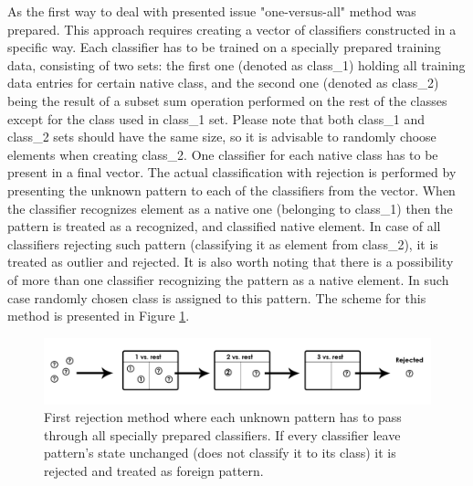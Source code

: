 \documentclass{llncs}
\begin{document}
As the first way to deal with presented issue "one-versus-all" method was prepared. This approach requires creating a vector of classifiers constructed in a specific way. Each classifier has to be trained on a specially prepared training data, consisting of two sets: the first one (denoted as class\_1) holding all training data entries for certain native class, and the second one (denoted as class\_2) being the result of a subset sum operation performed on the rest of the classes except for the class used in class\_1 set. Please note that both class\_1 and class\_2 sets should have the same size, so it is advisable to randomly choose elements when creating class\_2. One classifier for each native class has to be present in a final vector. The actual classification with rejection is performed by presenting the unknown pattern to each of the classifiers from the vector. When the classifier recognizes element as a native one (belonging to class\_1) then the pattern is treated as a recognized, and classified native element. In case of all classifiers rejecting such pattern (classifying it as element from class\_2), it is treated as outlier and rejected. It is also worth noting that there is a possibility of more than one classifier recognizing the pattern as a native element. In such case randomly chosen class is assigned to this pattern. The scheme for this method is presented in Figure \ref{fig:rejection_version1}. \\

\begin{figure}[!t]
	\centering
	\includegraphics[width=1\textwidth]{_Figures/ClassificationWithRejection1.jpg}
	\caption{First rejection method where each unknown pattern has to pass through all specially prepared classifiers. If every classifier leave pattern's state unchanged (does not classify it to its class) it is rejected and treated as foreign pattern. }
	\label{fig:rejection_version1}
\end{figure}
\end{document}
